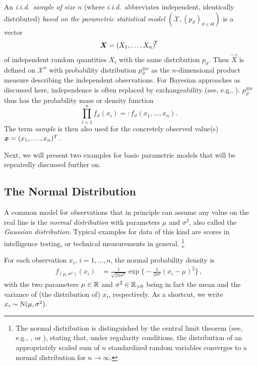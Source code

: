An \emph{i.i.d.\ sample of size} $n$ (where \emph{i.i.d.}\ abbreviates independent, identically distributed)
\emph{based on the parametric statistical model} %
$(\mathcal{X}, (p_\vartheta)_{\vartheta \in \Theta})$ is a vector
\[
\vec{X} = (X_1, \ldots, X_n)^\tra %
\]
of independent random quantities $X_i$ with the same distribution $p_\vartheta$.
Then $\vec{X}$ is defined on $\mathcal{X}^n$ with probability distribution $p_\vartheta^{\otimes n}$
as the $n$-dimensional product measure describing the independent observations.
For Bayesian approaches as discussed here,
independence is often replaced by exchangeability (see, e.g., \textcite[\S 4.2]{2000:bernardosmith}).
$p_\vartheta^{\otimes n}$ thus has the probability mass or density function
\[
\prod_{i=1}^{n} f_\vartheta(x_i) =: f_\vartheta(x_1, \ldots, x_n).%
\]
The term \emph{sample} is then also used for the concretely observed value(s) ${\bm x}=(x_1, \ldots, x_n)^T$.%

Next, we will present two examples for basic parametric models that will be repeatedly discussed further on.


\subsection{The Normal Distribution}
\label{sec:normaldist}

A common model for observations that in principle can assume any value on the real line
is the \emph{normal distribution} with parameters $\mu$ and $\sigma^2$, also called the \emph{Gaussian distribution}.
Typical examples for data of this kind are scores in intelligence testing, or technical measurements in general.%
\footnote{The normal distribution is distinguished by the central limit theorem
(see, e.g., \textcite[\S 7.3]{1993:karr}, or \textcite[\S 9]{1968:breiman}), stating that, under regularity conditions,
the distribution of an appropriately scaled sum of $n$ standardized random variables converges to a normal distribution
for $n \to \infty$.}

For each observation $x_i$, $i=1,\ldots, n$, the normal probability density is
\begin{align*}
f_{(\mu, \sigma^2)}(x_{i}) &= \frac{1}{\sqrt{2\pi\sigma^2}}\exp\Big\{ -\frac{1}{2\sigma^2}(x_{i} - \mu)^2 \Big\}\,,
\end{align*}
with the two parameters $\mu \in \mathbb{R}$ and $\sigma^2 \in \mathbb{R}_{>0}$
being in fact the mean and the variance of (the distribution of) $x_i$, respectively.
As a shortcut, we write $x_i \sim \operatorname{N}(\mu, \sigma^2)$.

